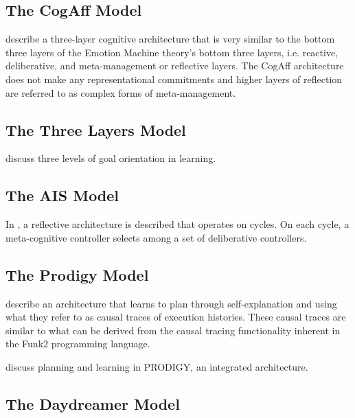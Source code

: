 \subsection{The CogAff Model}

\cite{sloman:2001} describe a three-layer cognitive architecture that is very similar to the bottom three layers of the Emotion Machine theory's bottom three layers, i.e. reactive, deliberative, and meta-management or reflective layers.
The CogAff architecture does not make any representational commitments and higher layers of reflection are referred to as complex forms of meta-management.

\subsection{The Three Layers Model}

\cite{ngbereiter:1995} discuss three levels of goal orientation in learning.

\subsection{The AIS Model}

In \cite{hayesroth:1995}, a reflective architecture is described that operates on cycles.
On each cycle, a meta-cognitive controller selects among a set of deliberative controllers.

\subsection{The Prodigy Model}

\cite{carbonell:1991} describe an architecture that learns to plan through self-explanation and using what they refer to as causal traces of execution histories.
These causal traces are similar to what can be derived from the causal tracing functionality inherent in the Funk2 programming language.

\cite{carbonell:1995} discuss planning and learning in PRODIGY, an integrated architecture.

\subsection{The Daydreamer Model}

